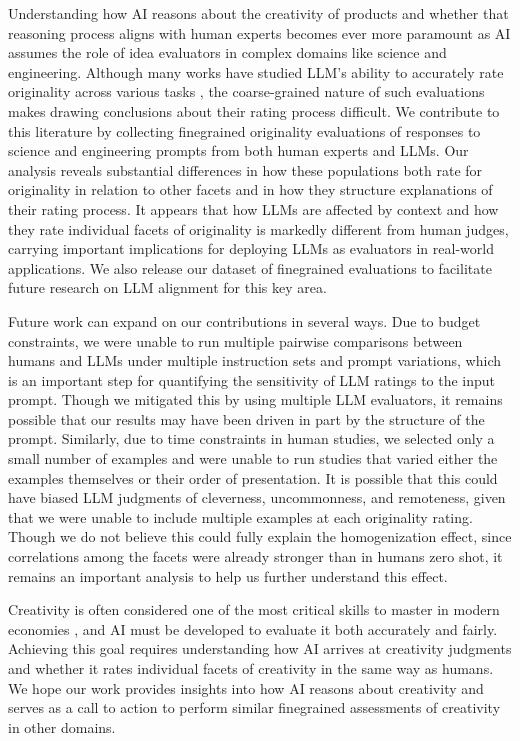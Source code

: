 Understanding how AI reasons about the creativity of products and whether that reasoning process aligns with human experts becomes ever more paramount as AI assumes the role of idea evaluators in complex domains like science and engineering. Although many works have studied LLM's ability to accurately rate originality across various tasks \citep{lin2024evaluating,schmidgall2025agent}, the coarse-grained nature of such evaluations makes drawing conclusions about their rating process difficult. We contribute to this literature by collecting finegrained originality evaluations of responses to science and engineering prompts from both human experts and LLMs. Our analysis reveals substantial differences in how these populations both rate for originality in relation to other facets and in how they structure explanations of their rating process. It appears that how LLMs are affected by context and how they rate individual facets of originality is markedly different from human judges, carrying important implications for deploying LLMs as evaluators in real-world applications. We also release our dataset of finegrained evaluations to facilitate future research on LLM alignment for this key area.

Future work can expand on our contributions in several ways. Due to budget constraints, we were unable to run multiple pairwise comparisons between humans and LLMs under multiple instruction sets and prompt variations, which is an important step for quantifying the sensitivity of LLM ratings to the input prompt. Though we mitigated this by using multiple LLM evaluators, it remains possible that our results may have been driven in part by the structure of the prompt. Similarly, due to time constraints in human studies, we selected only a small number of examples and were unable to run studies that varied either the examples themselves or their order of presentation. It is possible that this could have biased LLM judgments of cleverness, uncommonness, and remoteness, given that we were unable to include multiple examples at each originality rating. Though we do not believe this could fully explain the homogenization effect, since correlations among the facets were already stronger than in humans zero shot, it remains an important analysis to help us further understand this effect.

Creativity is often considered one of the most critical skills to master in modern economies \citep{illessy2020automation,tsegaye2019antecedent}, and AI must be developed to evaluate it both accurately and fairly. Achieving this goal requires understanding how AI arrives at creativity judgments and whether it rates individual facets of creativity in the same way as humans. We hope our work provides insights into how AI reasons about creativity and serves as a call to action to perform similar finegrained assessments of creativity in other domains.